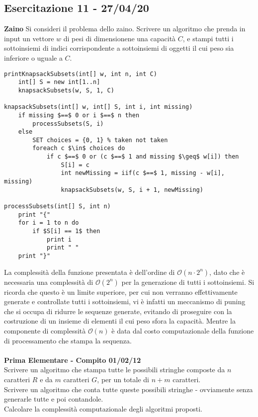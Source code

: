 \documentclass[../cheatSheetAlgoritmi.tex]{subfiles}
\begin{document}
\subsection{Esercitazione 11 - 27/04/20}
\textbf{Zaino}
Si consideri il problema dello zaino. Scrivere un algoritmo che prenda in input un vettore $w$ di pesi di dimensionene una capacità $C$, e stampi tutti i sottoinsiemi di indici corrispondente a sottoinsiemi di oggetti il cui peso sia inferiore o uguale a $C$.
\begin{lstlisting}[caption=Stampa i subsets di Knapsack]
printKnapsackSubsets(int[] w, int n, int C)
    int[] S = new int[1..n]
    knapsackSubsets(w, S, 1, C)

knapsackSubsets(int[] w, int[] S, int i, int missing)
    if missing $==$ 0 or i $==$ n then
        processSubsets(S, i)
    else 
        SET choices = {0, 1} % taken not taken
        foreach c $\in$ choices do
            if c $==$ 0 or (c $==$ 1 and missing $\geq$ w[i]) then
                S[i] = c
                int newMissing = iif(c $==$ 1, missing - w[i], missing)
                knapsackSubsets(w, S, i + 1, newMissing)
                
processSubsets(int[] S, int n) 
    print "{"
    for i = 1 to n do
        if $S[i] == 1$ then
            print i
            print " "
    print "}"
\end{lstlisting}
La complessità della funzione presentata è dell'ordine di $\mathcal{O}(n \cdot 2^n)$, dato che è necessaria una complessità di $\mathcal{O}(2^n)$ per la generazione di tutti i sottoinsiemi. Si ricorda che questo è un limite superiore, per cui non verranno effettivamente generate e controllate tutti i sottoinsiemi, vi è infatti un meccanismo di puning che si occupa di ridurre le sequenze generate, evitando di proseguire con la costruzione di un insieme di elementi il cui peso sfora la capacità. Mentre la componente di complessità $\mathcal{O}(n)$ è data dal costo computazionale della funzione di processamento che stampa la sequenza.\\\\
\textbf{Prima Elementare - Compito 01/02/12}\\
Scrivere un algoritmo che stampa tutte le possibili stringhe composte da $n$ caratteri $R$ e da $m$ caratteri $G$, per un totale di $n+m$ caratteri.\\
Scrivere un algoritmo che conta tutte queste possibili stringhe - ovviamente senza generarle tutte e poi contandole.\\
Calcolare la complessità computazionale degli algoritmi proposti.
\end{document}
